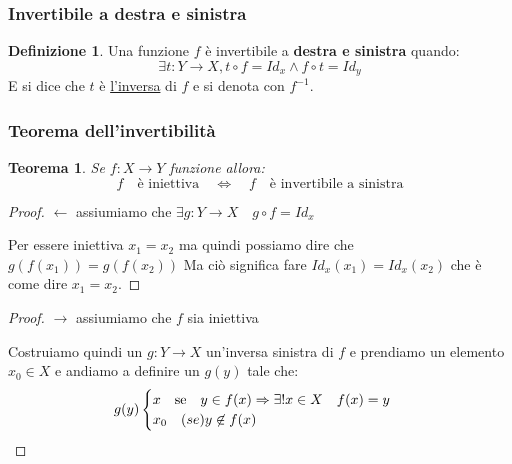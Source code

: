\documentclass{article}
\newtheorem{theorem}{Teorema}[section]
\theoremstyle{definition}
\newtheorem{definition}{Definizione}[section]
\begin{document}
\subsubsection{Invertibile a destra e sinistra}\label{sec:invertibile_a_destra_e_sinistra}
\begin{definition}     
        Una funzione $ f $ è invertibile a \textbf{destra e sinistra} quando:
        \begin{equation*}
                \exists t : Y \to X, t \circ f = Id_x \wedge f \circ t = Id_y 
        \end{equation*}
        E si dice che $ t  $ è \underline{l'inversa} di $ f $ e si denota con $ f^{-1} $.           
\end{definition}


\subsubsection{Teorema dell'invertibilità}
\begin{theorem}
       Se $ f: X \to Y $ funzione allora:
       \begin{equation*}
               f \quad \mbox{è iniettiva} \quad \Leftrightarrow \quad f \quad \mbox{è invertibile a sinistra}
       \end{equation*}
\end{theorem}

\begin{tcolorbox}
\begin{proof}
        $ \leftarrow $ assiumiamo che $ \exists g : Y \to X \quad g \circ f = Id_x  $ \par
        Per essere iniettiva $ x_1 = x_2$ ma quindi possiamo dire che $ g(f(x_1)) = g(f(x_2)) $ \newline
        Ma ciò significa fare $ Id_x(x_1) = Id_x(x_2) $ che è come dire $ x_1 = x_2 $.  
\end{proof}
\end{tcolorbox}

\begin{tcolorbox}
\begin{proof}
        $ \rightarrow $ assiumiamo che $ f$ sia iniettiva \par
        Costruiamo quindi un $ g : Y \to X $ un'inversa sinistra di $ f $ e prendiamo un elemento $x_0 \in X$ e andiamo a definire un $ g(y) $ tale che:
        \[ g(y)
        \begin{cases}
                x \quad \mbox{se} \quad y \in f(x) \Rightarrow \exists! x \in X \quad f(x) = y     \\
                x_0 \quad \mbox(se) y \not \in f(x)
        \end{cases}
        \]
\end{proof}
\end{tcolorbox}
\end{document}
